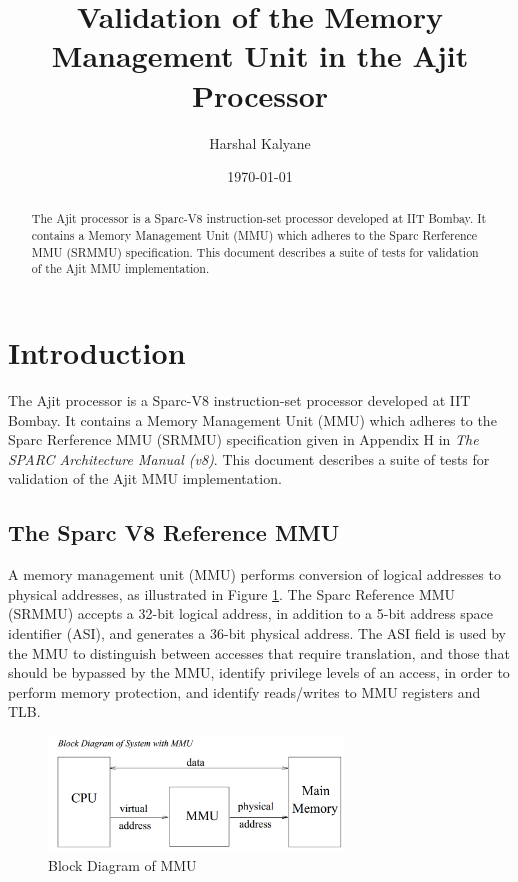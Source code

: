 \documentclass[12pt,a4paper]{article}
\title{Validation of the Memory Management Unit in the Ajit Processor}
\author{Harshal Kalyane}
\date{\today}
\begin{document}
\maketitle

\begin{abstract}
The Ajit processor is a Sparc-V8 instruction-set processor developed at IIT Bombay. 
It contains a Memory Management Unit (MMU) which adheres to the Sparc Rerference MMU (SRMMU)
specification. This document describes a suite of tests for validation of the Ajit MMU implementation.
\end{abstract}

\tableofcontents
\newpage

\section{Introduction}
The Ajit processor is a Sparc-V8 instruction-set processor developed at IIT
Bombay.  It contains a Memory Management Unit (MMU) which adheres to the Sparc
Rerference MMU (SRMMU) specification given in Appendix H in {\em The SPARC
Architecture Manual (v8)}.  This document describes a suite of tests for
validation of the Ajit MMU implementation.

\subsection{The Sparc V8 Reference MMU}

A memory management unit (MMU) performs conversion of logical addresses to
physical addresses, as illustrated in Figure \ref{fig:example1}. The Sparc
Reference MMU (SRMMU)  accepts a 32-bit logical address, in addition to a 5-bit
address space identifier (ASI), and generates a 36-bit physical address.  The
ASI field is used by the MMU to distinguish between accesses that require
translation, and those that should be bypassed by the MMU, identify privilege
levels of an access, in order to perform memory protection, and identify
reads/writes to MMU registers and TLB.
	\begin{figure}[h!]
	\centering
	\includegraphics[width=0.7\textwidth]{./figs/block_diagram.png}
	\caption{Block Diagram of MMU}
	\label{fig:example1}
	\end{figure}
\end{document}
